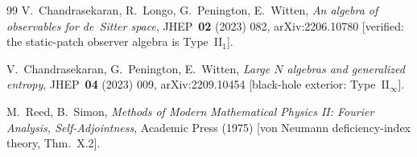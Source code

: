 \documentclass[11pt,a4paper]{article}
\theoremstyle{definition}
\theoremstyle{remark}
\begin{document}
\begin{thebibliography}{99}
V.~Chandrasekaran, R.~Longo, G.~Penington, E.~Witten,
\emph{An algebra of observables for de~Sitter space},
JHEP~\textbf{02} (2023) 082, arXiv:2206.10780 [verified: the
static-patch observer algebra is Type~II$_1$].

V.~Chandrasekaran, G.~Penington, E.~Witten, \emph{Large $N$
algebras and generalized entropy}, JHEP~\textbf{04} (2023)
009, arXiv:2209.10454 [black-hole exterior: Type~II$_\infty$].

M.~Reed, B.~Simon, \emph{Methods of Modern Mathematical
Physics II: Fourier Analysis, Self-Adjointness}, Academic
Press (1975) [von Neumann deficiency-index theory,
Thm.~X.2].

\end{thebibliography}
\end{document}
